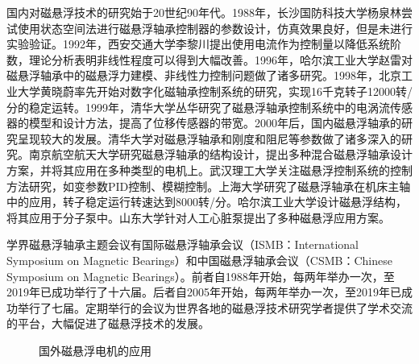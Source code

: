 \documentclass[
  lang=cn,
  degree=master,
  openany,oneside
]{nuaathesis}
\begin{document}
国内对磁悬浮技术的研究始于20世纪90年代。1988年，长沙国防科技大学杨泉林尝试使用状态空间法进行磁悬浮轴承控制器的参数设计\cite{杨泉林1988状态反馈去耦原理在磁悬浮轴承设计中的应用}，仿真效果良好，但是未进行实验验证。1992年，西安交通大学李黎川提出使用电流作为控制量以降低系统阶数，理论分析表明非线性程度可以得到大幅改善\cite{李黎川1992磁悬浮轴承物理模型的降阶及非线性改善}。1996年，哈尔滨工业大学赵雷对磁悬浮轴承中的磁悬浮力建模、非线性力控制问题做了诸多研究\cite{赵雷1996可控磁悬浮轴承刚度的提高与大范围稳定性,赵雷1996径向磁悬浮轴承结构特性研究及其模型的建立}。1998年，北京工业大学黄晓蔚率先开始对数字化磁轴承控制系统的研究，实现16千克转子12000转/分的稳定运转\cite{黄晓蔚1998数字控制的有源磁悬浮轴承的实验研究}。1999年，清华大学丛华研究了磁悬浮轴承控制系统中的电涡流传感器的模型和设计方法，提高了位移传感器的带宽\cite{丛华1999电涡流传感器动态响应特性研究}。2000年后，国内磁悬浮轴承的研究呈现较大的发展。清华大学对磁悬浮轴承和刚度和阻尼等参数做了诸多深入的研究\cite{赵雷1999可控磁悬浮轴承刚度与阻尼特性研究}。南京航空航天大学研究磁悬浮轴承的结构设计，提出多种混合磁悬浮轴承设计方案，并将其应用在多种类型的电机上\cite{朱熀秋2002永磁偏置径向,曾励1999永磁偏置的混合磁悬浮轴承的研究}。武汉理工大学关注磁悬浮控制系统的控制方法研究，如变参数PID控制、模糊控制\cite{苏义鑫2004磁悬浮轴承的变参数,刘晓军2006人工心脏泵磁悬浮转子非线性特性及控制方法研究}。上海大学研究了磁悬浮轴承在机床主轴中的应用，转子稳定运行转速达到8000转/分\cite{张钢2005磁悬浮支承技术在机床中的应用}。哈尔滨工业大学设计磁悬浮结构，将其应用于分子泵中\cite{周红海2006分子泵磁悬浮轴承结构及功率放大器设计}。山东大学针对人工心脏泵提出了多种磁悬浮应用方案\cite{关勇2010轴流式磁悬浮人工心脏泵磁悬浮轴承系统设计,杨晟2010轴流式磁悬浮人工心脏泵驱动电机的研究}。

学界磁悬浮轴承主题会议有国际磁悬浮轴承会议（ISMB：International Symposium on Magnetic Bearings）和中国磁悬浮轴承会议（CSMB：Chinese Symposium on Magnetic Bearings）。前者自1988年开始，每两年举办一次，至2019年已成功举行了十六届。后者自2005年开始，每两年举办一次，至2019年已成功举行了七届。定期举行的会议为世界各地的磁悬浮技术研究学者提供了学术交流的平台，大幅促进了磁悬浮技术的发展。

\begin{figure}[h!]
  \quad
  \quad
  \quad  
  \caption[国外磁悬浮电机的应用]{国外磁悬浮电机的应用\label{fig:industrial_amb}}
\end{figure}
\end{document}
